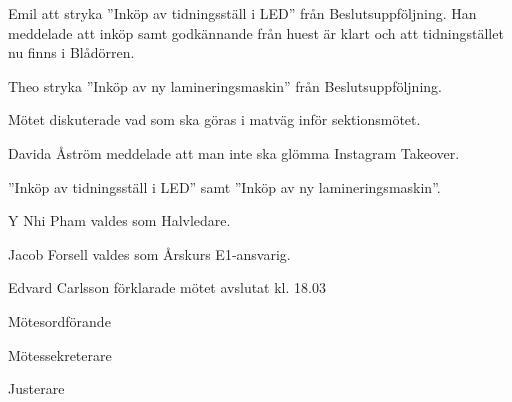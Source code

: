 \documentclass[10pt]{article}
\def\mo{Edvard Carlsson}
\def\ms{Mattias Lundström}
\def\ji{Theo Nyman}
\begin{document}
\begin{paragrafer}
Emil \ypa att stryka ''Inköp av tidningsställ i LED'' från Beslutsuppföljning. Han meddelade att inköp samt godkännande från huest är klart och att tidningstället nu finns i Blådörren.

\Mbaby


Theo \ypa stryka ''Inköp av ny lamineringsmaskin'' från Beslutsuppföljning. 

\Mbaby


Mötet diskuterade vad som ska göras i matväg inför sektionsmötet. 

Davida Åström meddelade att man inte ska glömma Instagram Takeover. 

\Fbs ''Inköp av tidningsställ i LED'' samt ''Inköp av ny lamineringsmaskin''.

Y Nhi Pham valdes som Halvledare.

Jacob Forsell valdes som Årskurs E1-ansvarig.

{\mo} förklarade mötet avslutat kl. 18.03
\end{paragrafer}

\hidesignfoot
\begin{signatures}{3}
\signature{\mo}{Mötesordförande}
\signature{\ms}{Mötessekreterare}
\signature{\ji}{Justerare}
\end{signatures}
\end{document}
